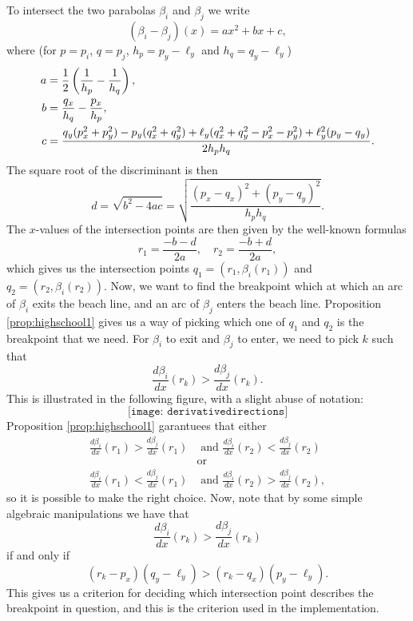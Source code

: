 To intersect the two parabolas $\beta_i$ and $\beta_j$ we write
\[
    (\beta_i - \beta_j)(x) = a x^2 + b x + c,
\]
where (for $p = p_i$, $q = p_j$, $h_p = p_y - \ell_y$ and $h_q = q_y - \ell_y$)
\begin{align*}
    a &= \frac{1}{2} \left(\frac{1}{h_p} - \frac{1}{h_q}\right), \\
    b &= \frac{q_x}{h_q} - \frac{p_x}{h_p}, \\
    c &= \frac{q_y(p_x^2 + p_y^2) - p_y (q_x^2 + q_y^2) + \ell_y (q_x^2 + q_y^2 - p_x^2 - p_y^2) + \ell_y^2 (p_y - q_y)}{2 h_p h_q}.
\end{align*}
The square root of the discriminant is then
\[
    d = \sqrt{b^2 - 4 ac} = \sqrt{\frac{(p_x - q_x)^2 + (p_y - q_y)^2}{h_p h_q}}.
\]
The $x$-values of the intersection points are then given by the well-known formulas
\[
    r_1 = \frac{-b - d}{2 a}, \quad
    r_2 = \frac{-b + d}{2 a},
\]
which gives us the intersection points $q_1 = (r_1, \beta_i(r_1))$ and $q_2 = (r_2, \beta_i(r_2))$. Now, we want to find the breakpoint which at which an arc of $\beta_i$ exits the beach line, and an arc of $\beta_j$ enters the beach line. Proposition \ref{prop:highschool1} gives us a way of picking which one of $q_1$ and $q_2$ is the breakpoint that we need. For $\beta_i$ to exit and $\beta_j$ to enter, we need to pick $k$ such that
\[
    \frac{d \beta_i}{dx}(r_k) > \frac{d \beta_j}{dx}(r_k).
\]
This is illustrated in the following figure, with a slight abuse of notation:
\[
    \texttt{[image: derivativedirections]}
\]
Proposition \ref{prop:highschool1} garantuees that either
\begin{align*}
    \frac{d \beta_i}{dx}(r_1) > \frac{d \beta_j}{dx}(r_1) &\text{ and } \frac{d \beta_i}{dx}(r_2) < \frac{d \beta_j}{dx}(r_2) \\
    &\text{or} \\
    \frac{d \beta_i}{dx}(r_1) < \frac{d \beta_j}{dx}(r_1) &\text{ and } \frac{d \beta_i}{dx}(r_2) > \frac{d \beta_j}{dx}(r_2),
\end{align*}
so it is possible to make the right choice. Now, note that by some simple algebraic manipulations we have that
\[
    \frac{d \beta_i}{dx}(r_k) > \frac{d \beta_j}{dx}(r_k)
\]
if and only if
\[
    (r_k - p_x) (q_y - \ell_y) > (r_k - q_x) (p_y - \ell_y).
\]
This gives us a criterion for deciding which intersection point describes the breakpoint in question, and this is the criterion used in the implementation.

